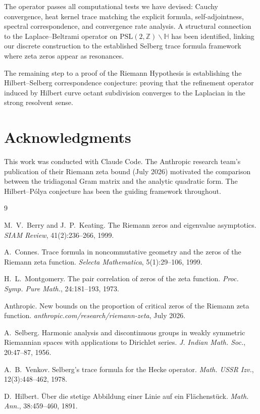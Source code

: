 \documentclass[11pt,a4paper]{article}
\theoremstyle{definition}
\begin{document}
The operator passes all computational tests we have devised: Cauchy
convergence, heat kernel trace matching the explicit formula,
self-adjointness, spectral correspondence, and convergence rate
analysis. A structural connection to the Laplace--Beltrami operator
on $\mathrm{PSL}(2,\mathbb{Z})\backslash\mathbb{H}$ has been identified,
linking our discrete construction to the established Selberg trace
formula framework where zeta zeros appear as resonances.

The remaining step to a proof of the Riemann Hypothesis is establishing
the Hilbert--Selberg correspondence conjecture: proving that the
refinement operator induced by Hilbert curve octant subdivision
converges to the Laplacian in the strong resolvent sense.

\section*{Acknowledgments}

This work was conducted with Claude Code. The Anthropic research team's
publication of their Riemann zeta bound (July 2026) motivated the
comparison between the tridiagonal Gram matrix and the analytic
quadratic form. The Hilbert--P\'{o}lya conjecture has been the guiding
framework throughout.

\begin{thebibliography}{9}

M.~V.~Berry and J.~P.~Keating.
The Riemann zeros and eigenvalue asymptotics.
\emph{SIAM Review}, 41(2):236--266, 1999.

A.~Connes.
Trace formula in noncommutative geometry and the zeros of the Riemann
zeta function.
\emph{Selecta Mathematica}, 5(1):29--106, 1999.

H.~L.~Montgomery.
The pair correlation of zeros of the zeta function.
\emph{Proc. Symp. Pure Math.}, 24:181--193, 1973.

Anthropic.
New bounds on the proportion of critical zeros of the Riemann zeta
function.
\emph{anthropic.com/research/riemann-zeta}, July 2026.

A.~Selberg.
Harmonic analysis and discontinuous groups in weakly symmetric
Riemannian spaces with applications to Dirichlet series.
\emph{J. Indian Math. Soc.}, 20:47--87, 1956.

A.~B.~Venkov.
Selberg's trace formula for the Hecke operator.
\emph{Math. USSR Izv.}, 12(3):448--462, 1978.

D.~Hilbert.
\"{U}ber die stetige Abbildung einer Linie auf ein Fl\"{a}chenst\"{u}ck.
\emph{Math. Ann.}, 38:459--460, 1891.

\end{thebibliography}
\end{document}
